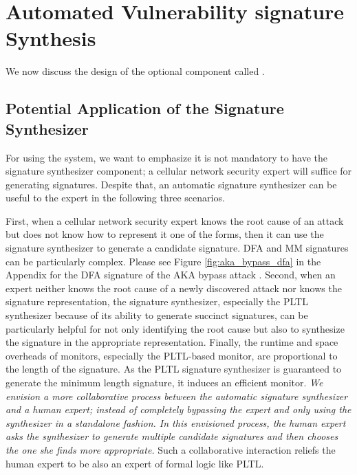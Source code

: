 \section{Automated Vulnerability signature Synthesis}\label{atk-syn}
We now discuss the design of the optional \system component called \signatureSynthesizer.

\subsection{Potential Application of the Signature Synthesizer}
For using the \system system, we want to emphasize it is not mandatory to have the
signature synthesizer component; a cellular network security expert will suffice for
generating signatures. Despite that, an automatic signature synthesizer can be useful to the expert
in the following three scenarios.

First, when a cellular network security expert knows the root cause of an attack but does not
know how to represent it one of the forms, then it can use the signature synthesizer to generate
a candidate signature. DFA and MM signatures can be particularly complex.
Please see Figure \ref{fig:aka_bypass_dfa} in the Appendix
for the DFA signature of the AKA bypass attack \cite{kim_ltefuzz_sp19}.
Second, when an expert neither knows the root cause of a newly discovered attack nor knows the signature representation, the
signature synthesizer, especially the PLTL synthesizer because of its ability to generate succinct signatures,
can be particularly helpful for not only
identifying the root cause but also to synthesize the signature in the appropriate representation.
Finally, the runtime and space overheads of monitors, especially the PLTL-based monitor, are proportional
to the length of the signature. As the PLTL signature synthesizer is guaranteed to generate the minimum length
signature, it induces an efficient monitor. \emph{We envision a more collaborative process between
the automatic signature synthesizer and a human expert; instead of completely bypassing the expert and only using
the synthesizer in a standalone fashion. In this envisioned process,
the human expert asks the synthesizer to
generate multiple candidate signatures and then chooses the one she finds more appropriate.}
Such a collaborative interaction reliefs the human expert to be also an expert of formal logic like PLTL.



